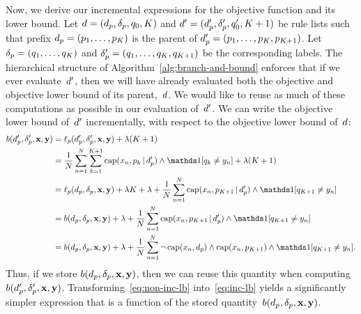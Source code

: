\begin{arxiv}
Now, we derive our incremental expressions for the objective function and its lower bound.
%
Let ${{d} = (d_p, \delta_p, q_0, K)}$ and
${{d}' = (d_p', \delta_p', q_0', K + 1)}$
be rule lists such that prefix ${d_p = (p_1, \dots, p_K)}$
is the parent of ${d_p' = (p_1, \dots, p_K, p_{K+1})}$.
%
Let ${\delta_p = (q_1, \dots, q_K)}$ and
${\delta_p' = (q_1, \dots, q_K, q_{K+1})}$ be the corresponding labels.
%
The hierarchical structure of Algorithm~\ref{alg:branch-and-bound}
enforces that if we ever evaluate~${d}'$, then we will have already
evaluated both the objective and objective lower bound of its parent,~${d}$.
%
We would like to reuse as much of these computations as possible
in our evaluation of~${d}'$.
%
We can write the objective lower bound of~${d}'$ incrementally,
with respect to the objective lower bound of~${d}$:
\begin{align}
b(\Prefix', \Labels', \x, \y)
  &= \Loss_p(\Prefix', \Labels', \x, \y) + \Reg (K + 1) \nn \\
&= \frac{1}{N} \sum_{n=1}^N \sum_{k=1}^{K+1} \Cap(x_n, p_k \given \Prefix')
  \wedge \one [ q_k \neq y_n ] + \Reg (K+1) \label{eq:non-inc-lb} \\
&= \Loss_p(\Prefix, \Labels, \x, \y) + \Reg K + \Reg
  + \frac{1}{N} \sum_{n=1}^N \Cap(x_n, p_{K+1} \given \Prefix') \wedge \one [q_{K+1} \neq y_n ] \nn \\
&= b(\Prefix, \Labels, \x, \y) + \Reg
  + \frac{1}{N} \sum_{n=1}^N \Cap(x_n, p_{K+1} \given \Prefix') \wedge \one [q_{K+1} \neq y_n ] \nn \\
&= b(\Prefix, \Labels, \x, \y) + \Reg  + \frac{1}{N} \sum_{n=1}^N \neg\, \Cap(x_n, \Prefix) \wedge
  \Cap(x_n, p_{K+1}) \wedge \one [q_{K+1} \neq y_n].
\label{eq:inc-lb}
\end{align}
Thus, if we store $b(d_p, \delta_p, \mathbf{x}, \mathbf{y})$, %
then we can reuse this quantity when computing $b(d_p', \delta_p', \mathbf{x}, \mathbf{y})$.
%
Transforming~\eqref{eq:non-inc-lb} into~\eqref{eq:inc-lb} yields a
significantly simpler expression that is a function of the stored
quantity~$b(d_p, \delta_p, \mathbf{x}, \mathbf{y})$. %

\end{arxiv}
